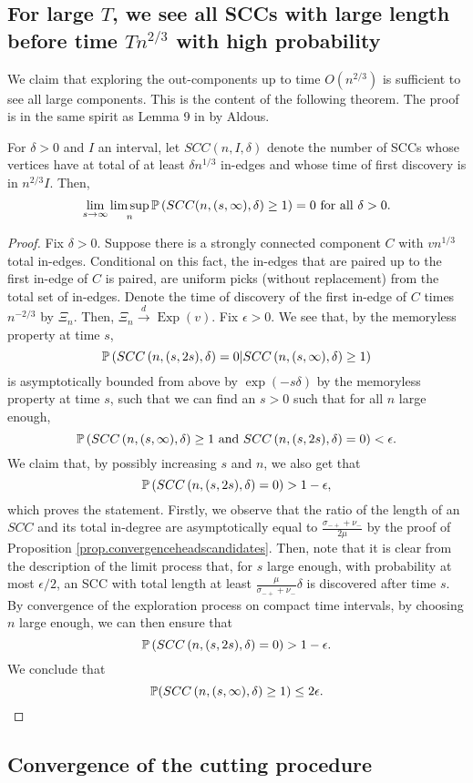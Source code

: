 \subsection{For large \texorpdfstring{$T$}{T}, we see all SCCs with large length before time \texorpdfstring{$Tn^{2/3}$}{T n**2/3} with high probability}
We claim that exploring the out-components up to time $O(n^{2/3})$ is sufficient to see all large components. This is the content of the following theorem. The proof is in the same spirit as Lemma 9 in \cite{Aldous1991} by Aldous. 
\begin{lemma}
For $\delta>0$ and $I$ an interval, let $SCC(n,I,\delta)$ denote the number of SCCs whose vertices have at total of at least $\delta n^{1/3}$ in-edges and whose time of first discovery is in $n^{2/3}I$. Then,
$$\lim_{s\to \infty}\limsup_{n} \P\left(SCC(n,(s,\infty),\delta)\geq 1\right)=0\text{ for all }\delta>0.$$
\end{lemma}
\begin{proof}
Fix $\delta>0$. Suppose there is a strongly connected component $C$ with $vn^{1/3}$ total in-edges. Conditional on this fact, the in-edges that are paired up to the first in-edge of $C$ is paired, are uniform picks (without replacement) from the total set of in-edges. Denote the time of discovery of the first in-edge of $C$ times $n^{-2/3}$ by $\Xi_n$. Then, $\Xi_n\overset{d}{\to}\operatorname{Exp}(v)$. Fix $\epsilon>0$. We see that, by the memoryless property at time $s$,
$$\P\left(SCC\left(n,(s,2s),\delta\right)=0|SCC\left(n,(s,\infty),\delta\right)\geq 1\right)$$
is asymptotically bounded from above by 
$\exp(-s\delta)$ by the memoryless property at time $s$, such that we can find an $s>0$ such that for all $n$ large enough,
$$\P\left(SCC\left(n,(s,\infty),\delta\right)\geq 1 \text{ and }SCC\left(n,(s,2s),\delta\right)=0\right)<\epsilon.$$
We claim that, by possibly increasing $s$ and $n$, we also get that 
$$\P\left(SCC\left(n,(s,2s),\delta\right)=0\right)>1-\epsilon,$$
which proves the statement.
Firstly, we observe that the ratio of the length of an $SCC$ and its total in-degree are asymptotically equal to $\frac{\sigma_{-+}+\nu_-}{2\mu}$ by the proof of Proposition \ref{prop.convergenceheadscandidates}. Then, note that it is clear from the description of the limit process that, for $s$ large enough, with probability at most $\epsilon/2$, an SCC with total length at least $\frac{\mu}{\sigma_{-+}+\nu_-}\delta$ is discovered after time $s$. By convergence of the exploration process on compact time intervals, by choosing $n$ large enough, we can then ensure that 
$$\P\left(SCC\left(n,(s,2s),\delta\right)=0\right)>1-\epsilon.$$
We conclude that 
$$\P(SCC\left(n,(s,\infty),\delta\right)\geq 1)\leq 2\epsilon.$$
\end{proof}
\subsection{Convergence of the cutting procedure}